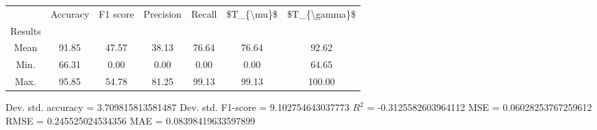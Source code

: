 \begin{tabular}{|c|c|c|c|c|c|c|}
\toprule
{} &  Accuracy &  F1 score &  Precision &  Recall &  \$T\_\{\textbackslash mu\}\$ &  \$T\_\{\textbackslash gamma\}\$ \\
Results &           &           &            &         &            &               \\
\hline
Mean    &     91.85 &     47.57 &      38.13 &   76.64 &      76.64 &         92.62 \\
Min.    &     66.31 &      0.00 &       0.00 &    0.00 &       0.00 &         64.65 \\
Max.    &     95.85 &     54.78 &      81.25 &   99.13 &      99.13 &        100.00 \\
\bottomrule
\end{tabular}

 Dev. std. accuracy = 3.709815813581487
 Dev. std. F1-score = 9.102754643037773
 $R^2$ = -0.3125582603964112
 MSE = 0.06028253767259612
 RMSE = 0.245525024534356
 MAE = 0.08398419633597899